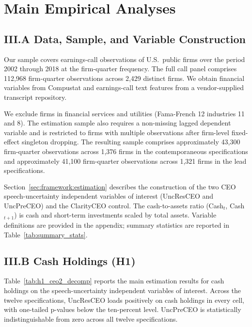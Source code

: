 
\section{Main Empirical Analyses}
\label{sec:main}

\subsection*{III.A Data, Sample, and Variable Construction}
\label{sec:main:data}

Our sample covers earnings-call observations of U.S.\ public firms over the period 2002 through 2018 at the firm-quarter frequency. The full call panel comprises 112,968 firm-quarter observations across 2,429 distinct firms. We obtain financial variables from Compustat and earnings-call text features from a vendor-supplied transcript repository.

We exclude firms in financial services and utilities (Fama-French 12 industries 11 and 8). The estimation sample also requires a non-missing lagged dependent variable and is restricted to firms with multiple observations after firm-level fixed-effect singleton dropping. The resulting sample comprises approximately 43,300 firm-quarter observations across 1,376 firms in the contemporaneous specifications and approximately 41,100 firm-quarter observations across 1,321 firms in the lead specifications.

Section~\ref{sec:framework:estimation} describes the construction of the two CEO speech-uncertainty independent variables of interest (UncResCEO and UncPreCEO) and the ClarityCEO control. The cash-to-assets ratio (Cash$_{t}$, Cash$_{t+1}$) is cash and short-term investments scaled by total assets. Variable definitions are provided in the appendix; summary statistics are reported in Table~\ref{tab:summary_stats}.

\subsection*{III.B Cash Holdings (H1)}
\label{sec:main:hc}

Table~\ref{tab:h1_ceo2_decomp} reports the main estimation results for cash holdings on the speech-uncertainty independent variables of interest. Across the twelve specifications, UncResCEO loads positively on cash holdings in every cell, with one-tailed p-values below the ten-percent level. UncPreCEO is statistically indistinguishable from zero across all twelve specifications.

